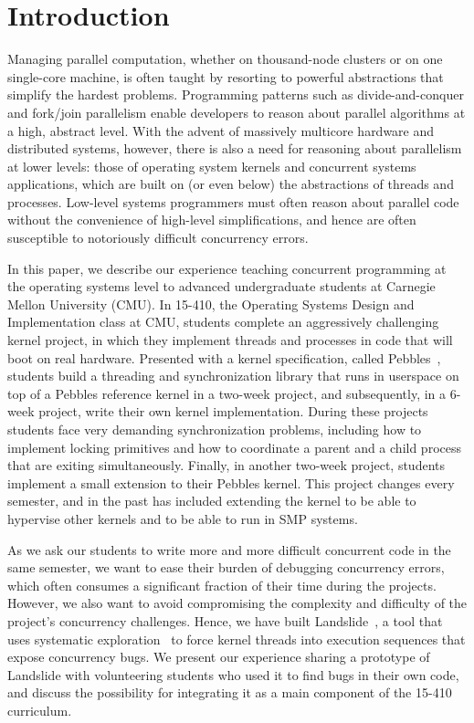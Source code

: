 \section{Introduction}

Managing parallel computation, whether on thousand-node clusters or on one single-core machine, is often taught by resorting to powerful abstractions that simplify the hardest problems.
Programming patterns such as divide-and-conquer and fork/join parallelism enable developers to reason about parallel algorithms at a high, abstract level.
With the advent of massively multicore hardware and distributed systems, however, there is also a need for reasoning about parallelism at lower levels: those of operating system kernels and concurrent systems applications, which are built on (or even below) the abstractions of threads and processes.
Low-level systems programmers must often reason about parallel code without the convenience of high-level simplifications, and hence are often susceptible to notoriously difficult concurrency errors.

In this paper, we describe our experience teaching concurrent programming at the operating systems level to advanced undergraduate students at Carnegie Mellon University (CMU).
In 15-410, the Operating Systems Design and Implementation class at CMU, students complete an aggressively challenging kernel project, in which they implement threads and processes in code that will boot on real hardware.
Presented with a kernel specification, called Pebbles~\cite{kspec}, students build a threading and synchronization library that runs in userspace on top of a Pebbles reference kernel in a two-week project, and subsequently, in a 6-week project, write their own kernel implementation.
During these projects students face very demanding synchronization problems, including how to implement locking primitives and how to coordinate a parent and a child process that are exiting simultaneously.
Finally, in another two-week project, students implement a small extension to their Pebbles kernel. This project changes every semester, and in the past has included extending the kernel to be able to hypervise other kernels and to be able to run in SMP systems.

As we ask our students to write more and more difficult concurrent code in the same semester, we want to ease their burden of debugging concurrency errors, which often consumes a significant fraction of their time during the projects.
However, we also want to avoid compromising the complexity and difficulty of the project's concurrency challenges. %
Hence, we have built Landslide~\cite{landslide}, a tool that uses systematic exploration~\cite{verisoft} to force kernel threads into execution sequences that expose concurrency bugs.
We present our experience sharing a prototype of Landslide with volunteering students who used it to find bugs in their own code, and discuss the possibility for integrating it as a main component of the 15-410 curriculum.

